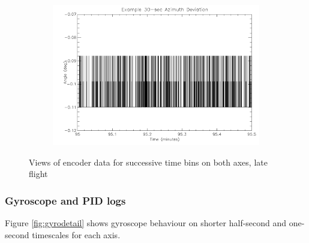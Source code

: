 {\begin{figure}[htbp]
\begin{subfigure}{0.45\textwidth}
		\caption{}
		\label{fig:sub:latealt30}
	\end{subfigure}
	\begin{subfigure}{0.45\textwidth}
		\includegraphics[width=1\linewidth]{appendix/img/campaign_results/lateaz30sec.png}
		\caption{}
		\label{fig:sub:lateaz30}
	\end{subfigure}
	\caption{Views of encoder data for successive time bins on both axes, late flight}
	\label{fig:lateflight}
\end{figure}

\newpage
\subsubsection*{Gyroscope and PID logs}

Figure \ref{fig:gyrodetail} shows gyroscope behaviour on shorter half-second and one-second timescales for each axis. 

}
